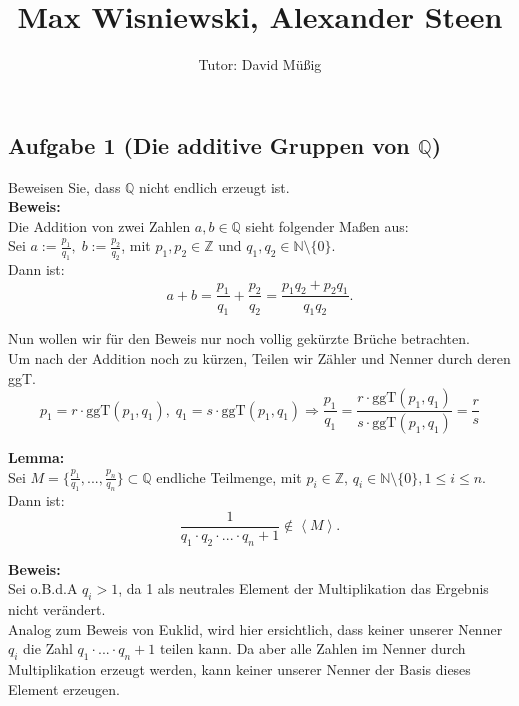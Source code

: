 \documentclass[11pt,a4paper,ngerman]{article}
\author{Tutor: David Müßig}
\date{}
\title{Max Wisniewski, Alexander Steen}
\newcommand{\NN}{\mathbb{N} \setminus \{0\}}
\newcommand{\Z}{\mathbb{Z}}
\newcommand{\Q}{\mathbb{Q}}
\newcommand{\ggT}{\text{ggT}}
\begin{document}

\maketitle
\thispagestyle{fancy}


\subsection*{Aufgabe 1 \mdseries (Die additive Gruppen von $\Q$)}
Beweisen Sie, dass $\Q$ nicht endlich erzeugt ist.\\

\textbf{Beweis:}\\

Die Addition von zwei Zahlen $a,b \in \Q$ sieht folgender Maßen aus:\\
Sei $a := \frac{p_1}{q_1}, \; b := \frac{p_2}{q_2}$, mit $p_1,p_2 \in \Z$ und $q_1,q_2 \in \NN$.\\
Dann ist:
$$
a+b = \frac{p_1}{q_1} + \frac{p_2}{q_2} = \frac{p_1q_2 + p_2q_1}{q_1q_2}.
$$

Nun wollen wir für den Beweis nur noch vollig gekürzte Brüche betrachten.\\
Um nach der Addition noch zu kürzen, Teilen wir Zähler und Nenner durch deren ggT.
$$
p_1 = r \cdot \ggT (p_1,q_1), \; q_1 = s \cdot \ggT (p_1,q_1) \Rightarrow \frac{p_1}{q_1}=\frac{r \cdot \ggT (p_1,q_1)}{s \cdot \ggT (p_1 ,q_1)} = \frac{r}{s}
$$

\textbf{Lemma:}\\
Sei $M = \{ \frac{p_1}{q_1} , ... , \frac{p_n}{q_n} \} \subset \Q$ endliche Teilmenge, mit $p_i \in \Z, \, q_i \in \NN, 1 \leq i \leq n$. Dann ist:
$$\frac{1}{q_1 \cdot q_2 \cdot ... \cdot q_n + 1} \not\in \left< M \right>.$$

\textbf{Beweis:}\\
Sei o.B.d.A $q_i > 1$, da 1 als neutrales Element der Multiplikation das Ergebnis nicht verändert.\\

Analog zum Beweis von Euklid, wird hier ersichtlich, dass keiner unserer Nenner $q_i$ die Zahl $q_1 \cdot ... \cdot q_n + 1$ teilen kann. Da aber alle Zahlen im Nenner durch Multiplikation erzeugt werden, kann keiner unserer Nenner der Basis dieses Element erzeugen.\\
\end{document}
